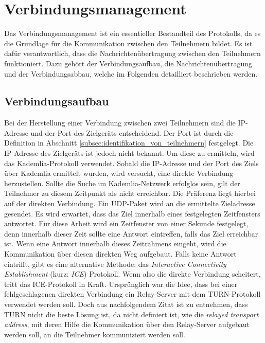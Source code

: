 \section{Verbindungsmanagement}
\label{subsec:verbindungsmanagement}

Das Verbindungsmanagement ist ein essentieller Bestandteil des Protokolls, da es die Grundlage für die Kommunikation zwischen den Teilnehmern bildet. Es ist dafür verantwortlich, dass die Nachrichtenübertragung zwischen den Teilnehmern funktioniert. Dazu gehört der Verbindungsaufbau, die Nachrichtenübertragung und der Verbindungsabbau, welche im Folgenden detailliert beschrieben werden.

\subsection{Verbindungsaufbau}
\label{label:verbindungsaufbau}

Bei der Herstellung einer Verbindung zwischen zwei Teilnehmern sind die IP-Adresse und der Port des Zielgeräts entscheidend. Der Port ist durch die Definition in Abschnitt \ref{subsec:identifikation_von_teilnehmern} festgelegt. Die IP-Adresse des Zielgeräts ist jedoch nicht bekannt. Um diese zu ermitteln, wird das Kademlia-Protokoll verwendet. Sobald die IP-Adresse und der Port des Ziels über Kademlia ermittelt wurden, wird versucht, eine direkte Verbindung herzustellen. Sollte die Suche im Kademlia-Netzwerk erfolglos sein, gilt der Teilnehmer zu diesem Zeitpunkt als nicht erreichbar. Die Präferenz liegt hierbei auf der direkten Verbindung. Ein UDP-Paket wird an die ermittelte Zieladresse gesendet. Es wird erwartet, dass das Ziel innerhalb eines festgelegten Zeitfensters antwortet. Für diese Arbeit wird ein Zeitfenster von einer Sekunde festgelegt, denn innerhalb dieser Zeit sollte eine Antwort eintreffen, falls das Ziel erreichbar ist. Wenn eine Antwort innerhalb dieses Zeitrahmens eingeht, wird die Kommunikation über diesen direkten Weg aufgebaut. Falls keine Antwort eintrifft, gibt es eine alternative Methode: das \textit{Interactive Connectivity Establishment} (kurz: \textit{ICE}) Protokoll. Wenn also die direkte Verbindung scheitert, tritt das ICE-Protokoll in Kraft.
Ursprünglich war die Idee, dass bei einer fehlgeschlagenen direkten Verbindung ein Relay-Server mit dem TURN-Protokoll verwendet werden soll. Doch aus nachfolgendem Zitat ist zu entnehmen, dass TURN nicht die beste Lösung ist, da nicht definiert ist, wie die \textit{relayed transport address}, mit deren Hilfe die Kommunikation über den Relay-Server aufgebaut werden soll, an die Teilnehmer kommuniziert werden soll.


